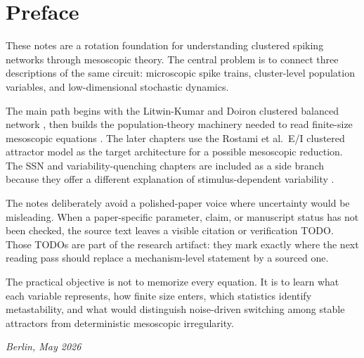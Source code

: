 \chapter*{Preface}

These notes are a rotation foundation for understanding clustered spiking networks through mesoscopic theory. The central problem is to connect three descriptions of the same circuit: microscopic spike trains, cluster-level population variables, and low-dimensional stochastic dynamics.

The main path begins with the Litwin-Kumar and Doiron clustered balanced network \parencite{litwinKumarDoiron2012}, then builds the population-theory machinery needed to read finite-size mesoscopic equations \parencite{schwalgerDegerGerstner2017}. The later chapters use the Rostami et al.\ E/I clustered attractor model \parencite{rostami2024spiking} as the target architecture for a possible mesoscopic reduction. The SSN and variability-quenching chapters are included as a side branch because they offer a different explanation of stimulus-dependent variability \parencite{rubinVanHooserMiller2015,hennequinEtAl2018,churchlandEtAl2010}.

The notes deliberately avoid a polished-paper voice where uncertainty would be misleading. When a paper-specific parameter, claim, or manuscript status has not been checked, the source text leaves a visible citation or verification TODO. Those TODOs are part of the research artifact: they mark exactly where the next reading pass should replace a mechanism-level statement by a sourced one.

The practical objective is not to memorize every equation. It is to learn what each variable represents, how finite size enters, which statistics identify metastability, and what would distinguish noise-driven switching among stable attractors from deterministic mesoscopic irregularity.

\bigskip
\noindent\textit{Berlin, May 2026}
